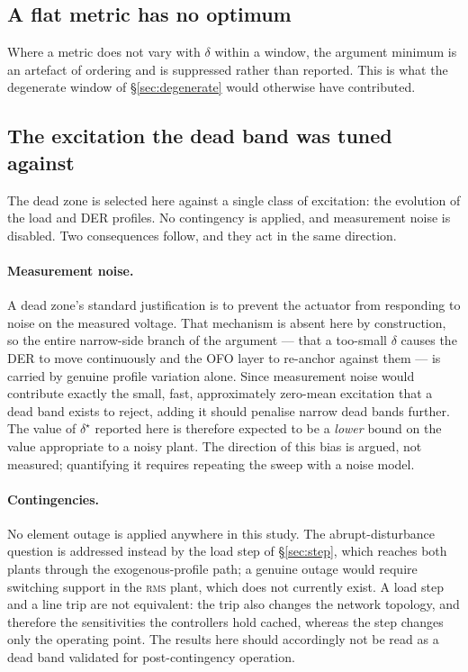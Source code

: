 \documentclass[11pt,a4paper]{article}
\newcommand{\rms}{\textsc{rms}}
\newcommand{\dz}{\ensuremath{\delta}}
\begin{document}
\subsection{A flat metric has no optimum}

Where a metric does not vary with $\dz$ within a window, the argument minimum is
an artefact of ordering and is suppressed rather than reported. This is what the
degenerate window of \S\ref{sec:degenerate} would otherwise have contributed.

\subsection{The excitation the dead band was tuned against}
\label{sec:excitation}

The dead zone is selected here against a single class of excitation: the
evolution of the load and DER profiles. No contingency is applied, and
measurement noise is disabled. Two consequences follow, and they act in the
same direction.

\paragraph{Measurement noise.} A dead zone's standard justification is to
prevent the actuator from responding to noise on the measured voltage. That
mechanism is absent here by construction, so the entire narrow-side branch of
the argument --- that a too-small $\dz$ causes the DER to move continuously and
the OFO layer to re-anchor against them --- is carried by genuine profile
variation alone. Since measurement noise would contribute exactly the small,
fast, approximately zero-mean excitation that a dead band exists to reject,
adding it should penalise narrow dead bands further. The value of $\dz^\star$
reported here is therefore expected to be a \emph{lower} bound on the value
appropriate to a noisy plant. The direction of this bias is argued, not
measured; quantifying it requires repeating the sweep with a noise model.

\paragraph{Contingencies.} No element outage is applied anywhere in this study.
The abrupt-disturbance question is addressed instead by the load step of
\S\ref{sec:step}, which reaches both plants through the exogenous-profile path;
a genuine outage would require switching support in the \rms{} plant, which does
not currently exist. A load step and a line trip are not equivalent: the trip
also changes the network topology, and therefore the sensitivities the
controllers hold cached, whereas the step changes only the operating point. The
results here should accordingly not be read as a dead band validated for
post-contingency operation.
\end{document}
